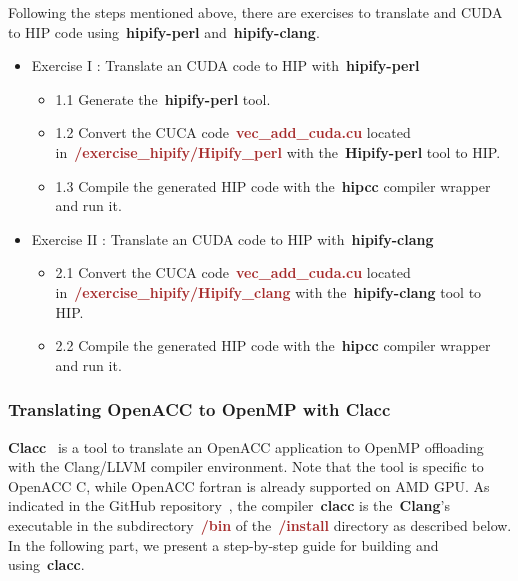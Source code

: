 


\par
Following the steps mentioned above, there are exercises to translate and CUDA to HIP code using~\textbf{hipify-perl} and~\textbf{hipify-clang}.


\begin{itemize}
    \item Exercise I : Translate an CUDA code to HIP with~\textbf{hipify-perl}
    \begin{itemize}
        \item 1.1 Generate the~\textbf{hipify-perl} tool.
        \item 1.2 Convert the CUCA code~\textbf{\textcolor{brown}{vec\_add\_cuda.cu}} located in~\textbf{\textcolor{brown}{/exercise\_hipify/Hipify\_perl}} with the~\textbf{Hipify-perl} tool to HIP.
        \item 1.3 Compile the generated HIP code with the~\textbf{hipcc} compiler wrapper and run it.
    \end{itemize}
    \item Exercise II : Translate an CUDA code to HIP with~\textbf{hipify-clang}
    \begin{itemize}
        \item 2.1 Convert the CUCA code~\textbf{\textcolor{brown}{vec\_add\_cuda.cu}} located in~\textbf{\textcolor{brown}{/exercise\_hipify/Hipify\_clang}} with the~\textbf{hipify-clang} tool to HIP.
        \item 2.2 Compile the generated HIP code with the~\textbf{hipcc} compiler wrapper and run it.
    \end{itemize}
\end{itemize}


\subsubsection{Translating OpenACC to OpenMP with Clacc}


\par
\textbf{Clacc}~\cite{clacc} is a tool to translate an OpenACC application to OpenMP offloading with the Clang/LLVM compiler environment.
Note that the tool is specific to OpenACC C, while OpenACC fortran is already supported on AMD GPU.
As indicated in the GitHub repository~\cite{llvm_project}, the compiler~\textbf{clacc} is the~\textbf{Clang}’s executable in the subdirectory~\textbf{\textcolor{brown}{/bin}} of the~\textbf{\textcolor{brown}{/install}} directory as described below.
In the following part, we present a step-by-step guide for building and using~\textbf{clacc}.


